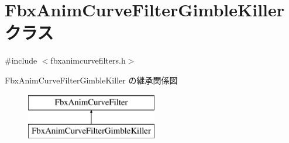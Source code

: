 \hypertarget{class_fbx_anim_curve_filter_gimble_killer}{}\section{Fbx\+Anim\+Curve\+Filter\+Gimble\+Killer クラス}
\label{class_fbx_anim_curve_filter_gimble_killer}


{\ttfamily \#include $<$fbxanimcurvefilters.\+h$>$}

Fbx\+Anim\+Curve\+Filter\+Gimble\+Killer の継承関係図\begin{figure}[H]
\begin{center}
\leavevmode
\includegraphics[height=2.000000cm]{class_fbx_anim_curve_filter_gimble_killer}
\end{center}
\end{figure}
